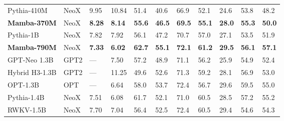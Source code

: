 \begin{table}[!th]
{\begin{tabular}{@{}lllllllllll@{}}
      Pythia-410M                                       & NeoX        & 9.95                  & 10.84                 & 51.4                 & 40.6                 & 66.9                 & 52.1                 & 24.6                 & 53.8                 & 48.2 \\
      \textbf{Mamba-370M}                               & NeoX        & \textbf{8.28}         & \textbf{8.14}         & \textbf{55.6}        & \textbf{46.5}        & \textbf{69.5}        & \textbf{55.1}        & \textbf{28.0}        & \textbf{55.3}        & \textbf{50.0} \\
      \midrule
      Pythia-1B                                         & NeoX        & 7.82                  & 7.92                  & 56.1                 & 47.2                 & 70.7                 & 57.0                 & 27.1                 & 53.5                 & 51.9 \\
      \textbf{Mamba-790M}                               & NeoX        & \textbf{7.33}         & \textbf{6.02}         & \textbf{62.7}        & \textbf{55.1}        & \textbf{72.1}        & \textbf{61.2}        & \textbf{29.5}        & \textbf{56.1}        & \textbf{57.1} \\
      \midrule
      GPT-Neo 1.3B                                      & GPT2        & ---                   & 7.50                  & 57.2                 & 48.9                 & 71.1                 & 56.2                 & 25.9                 & 54.9                 & 52.4 \\
      Hybrid H3-1.3B                                           & GPT2        & ---                   & 11.25                 & 49.6                 & 52.6                 & 71.3                 & 59.2                 & 28.1                 & 56.9                 & 53.0 \\
      OPT-1.3B                                          & OPT         & ---                   & 6.64                  & 58.0                 & 53.7                 & 72.4                 & 56.7                 & 29.6                 & 59.5                 & 55.0 \\
      Pythia-1.4B                                       & NeoX        & 7.51                  & 6.08                  & 61.7                 & 52.1                 & 71.0                 & 60.5                 & 28.5                 & 57.2                 & 55.2 \\
      RWKV-1.5B                                         & NeoX        & 7.70                  & 7.04                  & 56.4                 & 52.5                 & 72.4                 & 60.5                 & 29.4                 & 54.6                 & 54.3 \\

\end{tabular}}
\end{table}
